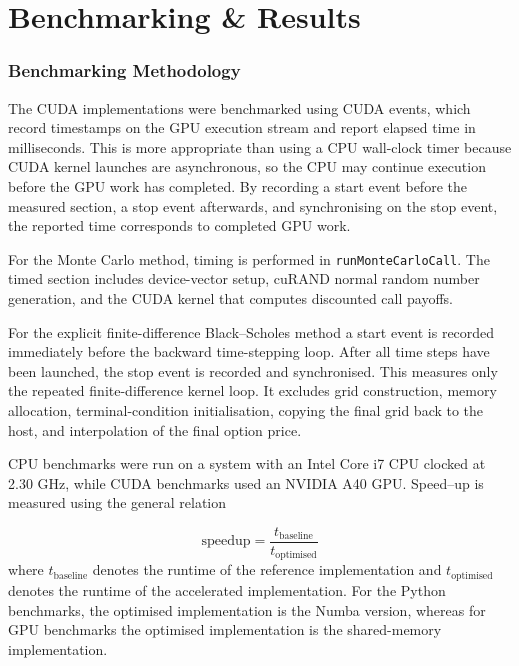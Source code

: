 \documentclass[11pt]{report}
\begin{document}
\chapter{Benchmarking \& Results}\label{sec:Benchmarks}

\subsection{Benchmarking Methodology}

The CUDA implementations were benchmarked 
using CUDA events, which record timestamps on 
the GPU execution stream and report elapsed time 
in milliseconds. This is more appropriate than using 
a CPU wall-clock timer because CUDA kernel launches are 
asynchronous, so the CPU may continue execution before 
the GPU work has completed. By recording a start event 
before the measured section, a stop event afterwards, and 
synchronising on the stop event, the reported time 
corresponds to completed GPU work\cite{harris2012performance}.

For the Monte Carlo method, timing is performed in 
\texttt{runMonteCarloCall}. The timed section 
includes device-vector setup, 
cuRAND normal random number generation, 
and the CUDA kernel that computes discounted call payoffs.

For the explicit finite-difference Black--Scholes 
method a start event is recorded immediately before the 
backward time-stepping loop. After all time steps have 
been launched, the stop event is recorded and 
synchronised. This 
measures only the repeated 
finite-difference kernel loop. 
It excludes grid construction, memory allocation, 
terminal-condition initialisation, 
copying the final grid back to the host, 
and interpolation of the final option price.

CPU benchmarks were run on a
system with an Intel Core i7 CPU clocked at 2.30 GHz, while CUDA benchmarks used an NVIDIA A40 GPU. Speed--up is measured using the general relation

\begin{equation}
  \text{speedup} = \frac{t_{\text{baseline}}}{t_{\text{optimised}}}
\end{equation}
where $t_{\text{baseline}}$ denotes the runtime of the reference 
implementation and $t_{\text{optimised}}$ denotes the runtime of the 
accelerated implementation. For the Python benchmarks, the optimised implementation is the Numba version,
whereas for GPU benchmarks the optimised implementation is the shared-memory implementation.
\end{document}

